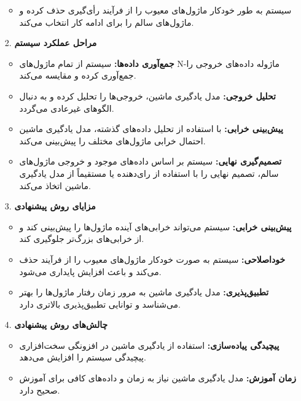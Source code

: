 \begin{qsolve}
	\begin{enumerate}
		\item [ ]
		\begin{itemize}
			\item سیستم به طور خودکار ماژول‌های معیوب را از فرآیند رأی‌گیری حذف کرده و ماژول‌های سالم را برای ادامه کار انتخاب می‌کند.
		\end{itemize}
		
		
		\item [2.]
		\textbf{مراحل عملکرد سیستم}\\
		\begin{itemize}
				\item \textbf{جمع‌آوری داده‌ها:} سیستم از تمام ماژول‌های N-ماژوله داده‌های خروجی را جمع‌آوری کرده و مقایسه می‌کند.
				\item \textbf{تحلیل خروجی:} مدل یادگیری ماشین، خروجی‌ها را تحلیل کرده و به دنبال الگوهای غیرعادی می‌گردد.
				\item \textbf{پیش‌بینی خرابی:} با استفاده از تحلیل داده‌های گذشته، مدل یادگیری ماشین احتمال خرابی ماژول‌های مختلف را پیش‌بینی می‌کند.
				\item \textbf{تصمیم‌گیری نهایی:} سیستم بر اساس داده‌های موجود و خروجی ماژول‌های سالم، تصمیم نهایی را با استفاده از رای‌دهنده یا مستقیماً از مدل یادگیری ماشین اتخاذ می‌کند.
			\end{itemize}
		
		
		
		\item [3.]
		\textbf{مزایای روش پیشنهادی}\\
		\begin{itemize}
				\item \textbf{پیش‌بینی خرابی:} سیستم می‌تواند خرابی‌های آینده ماژول‌ها را پیش‌بینی کند و از خرابی‌های بزرگ‌تر جلوگیری کند.
				\item \textbf{خوداصلاحی:} سیستم به صورت خودکار ماژول‌های معیوب را از فرآیند حذف می‌کند و باعث افزایش پایداری می‌شود.
				\item \textbf{تطبیق‌پذیری:} مدل یادگیری ماشین به مرور زمان رفتار ماژول‌ها را بهتر می‌شناسد و توانایی تطبیق‌پذیری بالاتری دارد.
			\end{itemize}
		
		
		
		\item [4.]
		\textbf{چالش‌های روش پیشنهادی}\\
		\begin{itemize}
				\item \textbf{پیچیدگی پیاده‌سازی:} استفاده از یادگیری ماشین در افزونگی سخت‌افزاری پیچیدگی سیستم را افزایش می‌دهد.
				\item \textbf{زمان آموزش:} مدل یادگیری ماشین نیاز به زمان و داده‌های کافی برای آموزش صحیح دارد.
			\end{itemize}
		

\end{enumerate}
\end{qsolve}
